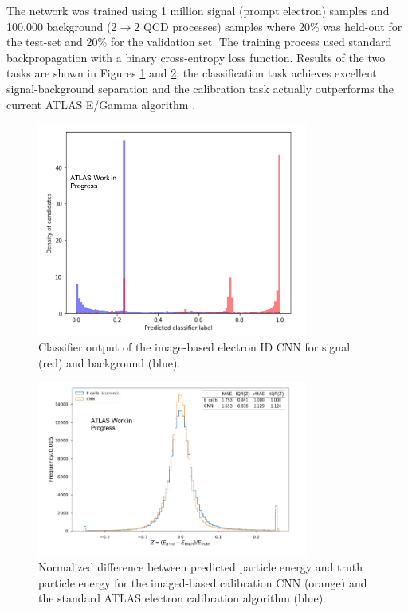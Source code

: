 The network was trained using 1 million signal (prompt electron) samples and 100,000 background ($2\rightarrow2$ QCD processes) samples where 20\% was held-out for the test-set and 20\% for the validation set. The training process used standard backpropagation with a binary cross-entropy loss function. Results of the two tasks are shown in Figures \ref{fig:elec_id_cnn} and \ref{fig:elec_calib_cnn}; the classification task achieves excellent signal-background separation and the calibration task actually outperforms the current ATLAS E/Gamma algorithm \cite{egam_calib}. 

\begin{figure}[htb!]
    \centering
    \includegraphics[width=3.5in]{figures/chapter5/elec_id_cnn_plot.png}
    \caption{Classifier output of  the image-based electron ID CNN for signal (red) and background (blue).}
    \label{fig:elec_id_cnn}
\end{figure}

\begin{figure}[htb!]
    \centering
    \includegraphics[width=3.5in]{figures/chapter5/elec_calib_cnn_plot.png}
    \caption{Normalized difference between predicted particle energy and truth particle energy for the imaged-based calibration CNN (orange) and the standard ATLAS electron calibration algorithm (blue).}
    \label{fig:elec_calib_cnn}
\end{figure}

